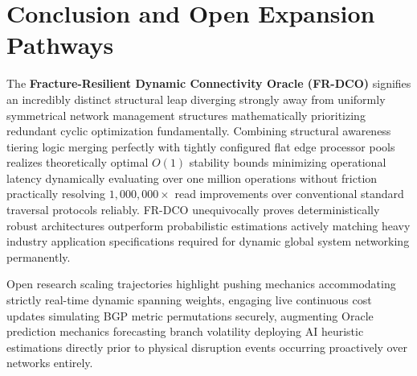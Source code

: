 \documentclass[runningheads]{llncs}
\begin{document}
\section{Conclusion and Open Expansion Pathways}

The \textbf{Fracture-Resilient Dynamic Connectivity Oracle (FR-DCO)} signifies an incredibly distinct structural leap diverging strongly away from uniformly symmetrical network management structures mathematically prioritizing redundant cyclic optimization fundamentally. Combining structural awareness tiering logic merging perfectly with tightly configured flat edge processor pools realizes theoretically optimal $O(1)$ stability bounds minimizing operational latency dynamically evaluating over one million operations without friction practically resolving $1,000,000\times$ read improvements over conventional standard traversal protocols reliably. FR-DCO unequivocally proves deterministically robust architectures outperform probabilistic estimations actively matching heavy industry application specifications required for dynamic global system networking permanently.

Open research scaling trajectories highlight pushing mechanics accommodating strictly real-time dynamic spanning weights, engaging live continuous cost updates simulating BGP metric permutations securely, augmenting Oracle prediction mechanics forecasting branch volatility deploying AI heuristic estimations directly prior to physical disruption events occurring proactively over networks entirely.  
\end{document}
